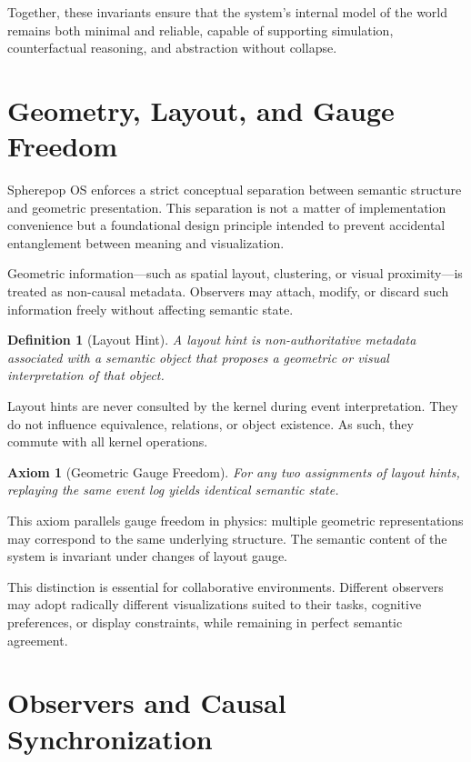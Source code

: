 \documentclass[11pt]{article}
\newtheorem{definition}{Definition}[section]
\newtheorem{axiom}{Axiom}[section]
\begin{document}
Together, these invariants ensure that the system’s internal model of the
world remains both minimal and reliable, capable of supporting simulation,
counterfactual reasoning, and abstraction without collapse.

\section{Geometry, Layout, and Gauge Freedom}

Spherepop OS enforces a strict conceptual separation between semantic
structure and geometric presentation. This separation is not a matter of
implementation convenience but a foundational design principle intended to
prevent accidental entanglement between meaning and visualization.

Geometric information—such as spatial layout, clustering, or visual
proximity—is treated as non-causal metadata. Observers may attach, modify,
or discard such information freely without affecting semantic state.

\begin{definition}[Layout Hint]
A layout hint is non-authoritative metadata associated with a semantic
object that proposes a geometric or visual interpretation of that object.
\end{definition}

Layout hints are never consulted by the kernel during event interpretation.
They do not influence equivalence, relations, or object existence. As such,
they commute with all kernel operations.

\begin{axiom}[Geometric Gauge Freedom]
For any two assignments of layout hints, replaying the same event log yields
identical semantic state.
\end{axiom}

This axiom parallels gauge freedom in physics: multiple geometric
representations may correspond to the same underlying structure. The
semantic content of the system is invariant under changes of layout gauge.

This distinction is essential for collaborative environments. Different
observers may adopt radically different visualizations suited to their
tasks, cognitive preferences, or display constraints, while remaining in
perfect semantic agreement.

\section{Observers and Causal Synchronization}
\end{document}
